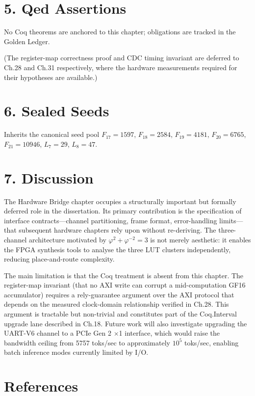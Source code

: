 \section{5. Qed
Assertions}\label{fa_12:qed-assertions}

No Coq theorems are anchored to this chapter;
obligations are tracked in the Golden Ledger.

(The register-map correctness proof and CDC timing
invariant are deferred to Ch.28 and Ch.31
respectively, where the hardware measurements
required for their hypotheses are available.)

\section{6. Sealed Seeds}\label{fa_12:sealed-seeds}

Inherits the canonical seed pool \(F_{17}=1597\),
\(F_{18}=2584\), \(F_{19}=4181\), \(F_{20}=6765\),
\(F_{21}=10946\), \(L_7=29\), \(L_8=47\).

\section{7. Discussion}\label{fa_12:discussion}

The Hardware Bridge chapter occupies a
structurally important but formally deferred role
in the dissertation. Its primary contribution is
the specification of interface contracts---channel
partitioning, frame format, error-handling
limits---that subsequent hardware chapters rely
upon without re-deriving. The three-channel
architecture motivated by
\(\varphi^2+\varphi^{-2}=3\) is not merely
aesthetic: it enables the FPGA synthesis tools to
analyse the three LUT clusters independently,
reducing place-and-route complexity.

The main limitation is that the Coq treatment is
absent from this chapter. The register-map
invariant (that no AXI write can corrupt a
mid-computation GF16 accumulator) requires a
rely-guarantee argument over the AXI protocol that
depends on the measured clock-domain relationship
verified in Ch.28. This argument is tractable but
non-trivial and constitutes part of the
Coq.Interval upgrade lane described in Ch.18.
Future work will also investigate upgrading the
UART-V6 channel to a PCIe Gen 2 $\times$1 interface,
which would raise the bandwidth ceiling from 5757
toks/sec to approximately \(10^5\) toks/sec,
enabling batch inference modes currently limited
by I/O.

\section{References}\label{fa_12:references}

